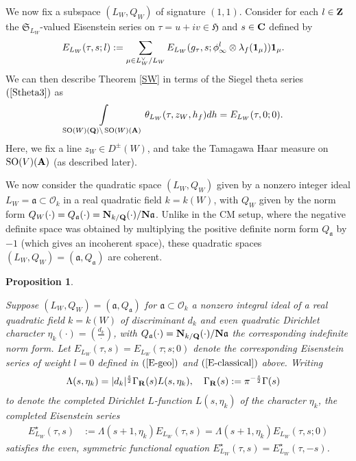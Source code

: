 \documentclass{amsart}
\newtheorem{proposition}[theorem]{Proposition}
\theoremstyle{definition}
\theoremstyle{definition}
\theoremstyle{definition}
\begin{document}
We now fix a subspace $(L_W, Q_W)$ of signature $(1,1)$.
Consider for each $l \in {\bf{Z}}$ the $\mathfrak{S}_{L_W}$-valued Eisenstein 
series on $\tau = u + iv \in \mathfrak{H}$ and $s \in {\bf{C}}$ defined by 
\begin{align}\label{E-geo} E_{L_W}(\tau, s; l) &:= \sum\limits_{ \mu \in L_W^{\vee} / L_W } 
E_{L_W}(g_{\tau}, s; \phi_{\infty}^l \otimes \lambda_f({\bf{1}}_{\mu})) {\bf{1}}_{\mu}. \end{align}
We can then describe Theorem \ref{SW} in terms of the Siegel theta series $(\ref{Stheta3})$ as 
\begin{align}\label{SW-geo} \int\limits_{  \operatorname{SO}(W)({\bf{Q}}) \backslash  \operatorname{SO}(W)({\bf{A}}) }
\theta_{L_W}(\tau, z_W, h_f) dh &= E_{L_W}(\tau, 0; 0). \end{align}
Here, we fix a line $z_W \in D^{\pm}(W)$, and take the Tamagawa Haar measure on $\operatorname{SO}(V)({\bf{A}})$ (as described later). 

We now consider the quadratic space $(L_W, Q_W)$ given by a nonzero integer ideal $L_W = \mathfrak{a} \subset \mathcal{O}_k$ in a real quadratic field $k = k(W)$, 
with $Q_W$ given by the norm form $Q_W(\cdot) = Q_{\mathfrak{a}}(\cdot) = {\bf{N}}_{k/{\bf{Q}}}(\cdot)/{\bf{N}} \mathfrak{a}$.
Unlike in the CM setup, where the negative definite space was obtained by multiplying the positive definite norm form 
$Q_{\mathfrak{a}}$ by $-1$ (which gives an incoherent space), these quadratic spaces $(L_W, Q_W) = (\mathfrak{a}, Q_{\mathfrak{a}})$ are coherent. 

\begin{proposition}\label{LFE-geo}

Suppose $(L_W, Q_W) = (\mathfrak{a}, Q_{\mathfrak{a}})$ for $\mathfrak{a} \subset \mathcal{O}_k$ a nonzero
integral ideal of a real quadratic field $k = k(W)$ of discriminant $d_k$ and even quadratic Dirichlet character $\eta_k(\cdot) = \left(\frac{d_k}{\cdot} \right)$,
with $Q_{\mathfrak{a}}(\cdot) = {\bf{N}}_{k/{\bf{Q}}}(\cdot)/{\bf{N}} \mathfrak{a}$ the corresponding indefinite norm form. 
Let $E_{L_W}(\tau, s) = E_{L_W}(\tau; s; 0)$ denote the corresponding Eisenstein series of weight $l=0$ defined in $(\ref{E-geo})$ 
and $(\ref{E-classical})$ above. Writing
\begin{align*} \Lambda(s, \eta_k) 
&= \vert d_k \vert^{\frac{s}{2}} \Gamma_{\bf{R}} (s) L(s, \eta_k), \quad \Gamma_{\bf{R}}(s) := \pi^{-\frac{s}{2}} \Gamma(s)\end{align*}
to denote the completed Dirichlet $L$-function $L(s, \eta_k)$ of the character $\eta_k$, the completed Eisenstein series
\begin{align*} E_{L_W}^{\star}(\tau, s) &:= \Lambda(s+1, \eta_k) E_{L_W}(\tau, s) = \Lambda(s+1, \eta_k) E_{L_W}(\tau, s; 0)\end{align*}
satisfies the even, symmetric functional equation $E_{L_W}^{\star}(\tau,s) = E_{L_W}^{\star}(\tau, -s)$.

\end{proposition}
\end{document}

